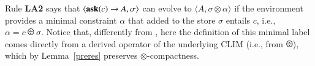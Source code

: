 \documentclass[main.tex]{subfiles}
\begin{document}
Rule {\bf LA2} says that $\langle \mathit{{\bf ask}}(c) \rightarrow A, \sigma \rangle$
can evolve to $\langle A, \sigma \otimes \alpha \rangle$ if the environment provides a minimal
constraint $\alpha$ that added to the store $\sigma$ entails $c$, i.e., $\alpha = c \odiv \sigma$.
Notice that, differently from \cite{pippo}, here the definition of this minimal label comes directly
from a derived operator of the underlying CLIM (i.e., from $\odiv$), which by Lemma~\ref{preres} preserves $\otimes$-compactness.
%
%
%
\end{document}
